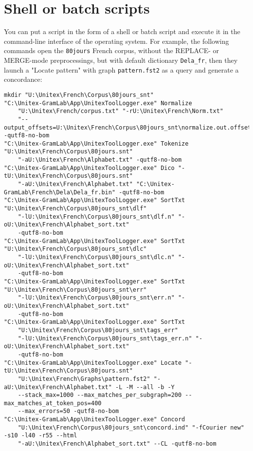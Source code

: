 \section{Shell or batch scripts}
\label{section-batch}

You can put a script in the form of a shell or batch script and execute it in the command-line
interface of the operating system. For example, the following commands open the
\verb$80jours$ French corpus, without the REPLACE- or MERGE-mode preprocessings, but with default
dictionary \verb$Dela_fr$, then they launch a "Locate pattern" with graph \verb$pattern.fst2$ as a query
and generate a concordance:

\begin{Verbatim}[fontsize=\small,fontfamily=helvetica]
mkdir "U:\Unitex\French\Corpus\80jours_snt" 
"C:\Unitex-GramLab\App\UnitexToolLogger.exe" Normalize
    "U:\Unitex\French/corpus.txt" "-rU:\Unitex\French\Norm.txt"
    "--output_offsets=U:\Unitex\French\Corpus\80jours_snt\normalize.out.offsets" -qutf8-no-bom
"C:\Unitex-GramLab\App\UnitexToolLogger.exe" Tokenize "U:\Unitex\French\Corpus\80jours.snt" 
    "-aU:\Unitex\French\Alphabet.txt" -qutf8-no-bom
"C:\Unitex-GramLab\App\UnitexToolLogger.exe" Dico "-tU:\Unitex\French\Corpus\80jours.snt" 
    "-aU:\Unitex\French\Alphabet.txt" "C:\Unitex-GramLab\French\Dela\Dela_fr.bin" -qutf8-no-bom
"C:\Unitex-GramLab\App\UnitexToolLogger.exe" SortTxt "U:\Unitex\French\Corpus\80jours_snt\dlf" 
    "-lU:\Unitex\French\Corpus\80jours_snt\dlf.n" "-oU:\Unitex\French\Alphabet_sort.txt"
    -qutf8-no-bom
"C:\Unitex-GramLab\App\UnitexToolLogger.exe" SortTxt "U:\Unitex\French\Corpus\80jours_snt\dlc" 
    "-lU:\Unitex\French\Corpus\80jours_snt\dlc.n" "-oU:\Unitex\French\Alphabet_sort.txt"
    -qutf8-no-bom
"C:\Unitex-GramLab\App\UnitexToolLogger.exe" SortTxt "U:\Unitex\French\Corpus\80jours_snt\err" 
    "-lU:\Unitex\French\Corpus\80jours_snt\err.n" "-oU:\Unitex\French\Alphabet_sort.txt"
    -qutf8-no-bom
"C:\Unitex-GramLab\App\UnitexToolLogger.exe" SortTxt
    "U:\Unitex\French\Corpus\80jours_snt\tags_err"
    "-lU:\Unitex\French\Corpus\80jours_snt\tags_err.n" "-oU:\Unitex\French\Alphabet_sort.txt"
    -qutf8-no-bom
"C:\Unitex-GramLab\App\UnitexToolLogger.exe" Locate "-tU:\Unitex\French\Corpus\80jours.snt" 
    "U:\Unitex\French\Graphs\pattern.fst2" "-aU:\Unitex\French\Alphabet.txt" -L -M --all -b -Y
    --stack_max=1000 --max_matches_per_subgraph=200 --max_matches_at_token_pos=400 
    --max_errors=50 -qutf8-no-bom
"C:\Unitex-GramLab\App\UnitexToolLogger.exe" Concord
    "U:\Unitex\French\Corpus\80jours_snt\concord.ind" "-fCourier new" -s10 -l40 -r55 --html 
    "-aU:\Unitex\French\Alphabet_sort.txt" --CL -qutf8-no-bom
\end{Verbatim}

